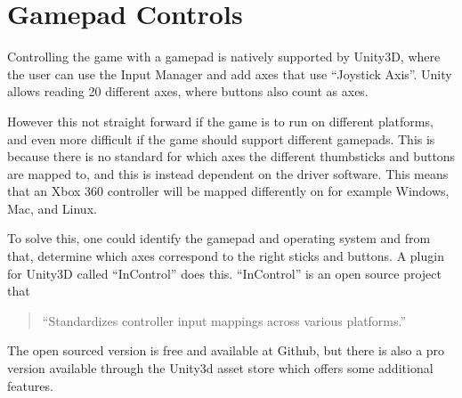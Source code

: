 \section{Gamepad Controls}
\label{sec:design:controls}

Controlling the game with a gamepad is natively supported by Unity3D, where the user can use the Input Manager \cite{unity_manual_inputmanager} and add axes that use ``Joystick Axis''. Unity allows reading 20 different axes, where buttons also count as axes.

However this not straight forward if the game is to run on different platforms, and even more difficult if the game should support different gamepads. This is because there is no standard for which axes the different thumbsticks and buttons are mapped to, and this is instead dependent on the driver software. This means that an Xbox 360 controller will be mapped differently on for example Windows, Mac, and Linux.
\cite{unity_wiki_xbox360controller}

To solve this, one could identify the gamepad and operating system and from that, determine which axes correspond to the right sticks and buttons. A plugin for Unity3D called ``InControl''\cite{incontrol_github} does this. ``InControl'' is an open source project that \begin{quote}``Standardizes controller input mappings across various platforms.''\cite{incontrol_website}\end{quote}

The open sourced version is free and available at Github, but there is also a pro version available through the Unity3d asset store\cite{incontrol_assetstore} which offers some additional features.